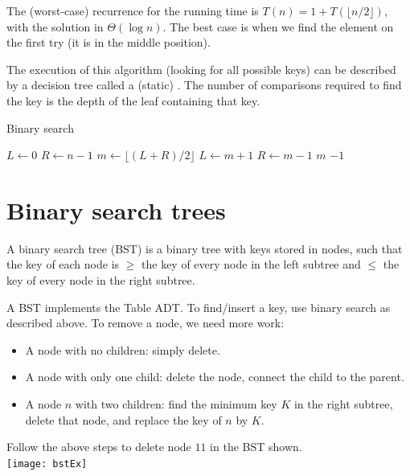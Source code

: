 The (worst-case) recurrence for the running time is $T(n) = 1 +  T(\lfloor n/2 \rfloor)$, with the
solution in $\Theta(\log n)$. 
The best case is when we find the element on the first try (it is in the middle position).

The execution of this algorithm (looking for all possible keys) can be 
described by a decision tree called a (static) . 
The number of comparisons required to find the key is the depth of the leaf containing that key.

\begin{algorithm}[H]
  \caption{Binary search}
    \label{alg:binsearch}
\begin{algorithmic}[1]
	\State $L \gets 0$
	\State $R \gets n - 1$
		\State $m \gets \lfloor (L + R)/2 \rfloor$ 
			\State $L \gets m + 1$
			\State $R \gets m - 1$
		\Else 
			\State \Return $m$ 
		\EndIf
	\EndWhile
	\Return $-1$ 
\EndFunction
\end{algorithmic}
\end{algorithm}

\section{Binary search trees}
\begin{Definition}
A {binary search tree} (BST) is a binary tree with keys stored in nodes, 
such that the key of each node is $\geq$ the key of every node in the left subtree and $\leq$ 
the key of  every node in the right subtree.
\end{Definition}

A BST implements the Table ADT. 
To find/insert a key, use binary search as described above. 
To remove a node, we need more work:
\begin{itemize}
\item A node with no children: simply delete.
\item A node with only one child: delete the node, connect the child 
to the parent.
\item A node $n$ with two children: find the minimum key $K$ in the 
right subtree, delete that node, and replace the key of $n$ by $K$.
\end{itemize}

\begin{Boxample}[1] \label{eg:bstDeleteRight}
Follow the above steps to delete node $11$ in the BST shown.\\
\newline
\texttt{[image: bstEx]}
\end{Boxample}


